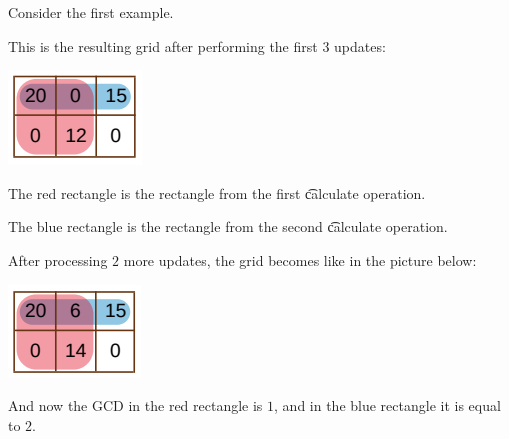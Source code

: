 Consider the first example.

This is the resulting grid after performing the first $3$ updates:

\includegraphics{1.png}

The red rectangle is the rectangle from the first \t{calculate} operation.

The blue rectangle is the rectangle from the second \t{calculate} operation.

After processing $2$ more updates, the grid becomes like in the picture below:

\includegraphics{2.png}

And now the GCD in the red rectangle is $1$, and in the blue rectangle it is equal to $2$.